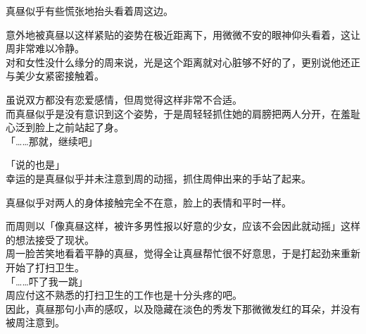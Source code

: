 真昼似乎有些慌张地抬头看着周这边。

意外地被真昼以这样紧贴的姿势在极近距离下，用微微不安的眼神仰头看着，这让周非常难以冷静。\\

对和女性没什么缘分的周来说，光是这个距离就对心脏够不好的了，更别说他还正与美少女紧密接触着。

虽说双方都没有恋爱感情，但周觉得这样非常不合适。\\

而真昼似乎是没有意识到这个姿势，于是周轻轻抓住她的肩膀把两人分开，在羞耻心泛到脸上之前站起了身。\\

「……那就，继续吧」

「说的也是」\\

幸运的是真昼似乎并未注意到周的动摇，抓住周伸出来的手站了起来。

真昼似乎对两人的身体接触完全不在意，脸上的表情和平时一样。

而周则以「像真昼这样，被许多男性报以好意的少女，应该不会因此就动摇」这样的想法接受了现状。\\

周一脸苦笑地看着平静的真昼，觉得全让真昼帮忙很不好意思，于是打起劲来重新开始了打扫卫生。\\

「……吓了我一跳」\\

周应付这不熟悉的打扫卫生的工作也是十分头疼的吧。\\

因此，真昼那句小声的感叹，以及隐藏在淡色的秀发下那微微发红的耳朵，并没有被周注意到。
